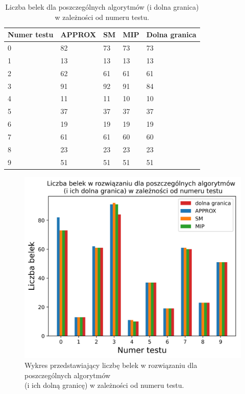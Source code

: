 \begin{table}[H] 
	\begin{center}
	\begin{tabular}{|p{3cm}|p{3cm}|p{3cm}|p{3cm}|p{3cm}| } 
		\hline
			Numer testu & APPROX & SM & MIP & Dolna granica\\ 
			\hline
			0 & 82 & 73 & 73 & 73\\ 
			1 & 13 & 13 & 13 & 13\\ 
			2 & 62 & 61 & 61 & 61\\ 
			3 & 91 & 92 & 91 & 84\\ 
			4 & 11 & 11 & 10 & 10\\ 
			5 & 37 & 37 & 37 & 37\\ 
			6 & 19 & 19 & 19 & 19\\ 
			7 & 61 & 61 & 60 & 60\\ 
			8 & 23 & 23 & 23 & 23\\ 
			9 & 51 & 51 & 51 & 51\\ 
			\hline
		\end{tabular}
			\caption{Liczba belek dla poszczególnych algorytmów (i dolna granica) w zależności od numeru testu.}
	\end{center}
\end{table}

\begin{figure}[H]
	\begin{center}
	\includegraphics[width=12cm]{plots/res}
	\caption{Wykres przedstawiający liczbę belek w rozwiązaniu dla poszczególnych algorytmów \\ (i ich dolną granicę) w zależności od numeru testu.}
	\end{center}
\end{figure}

